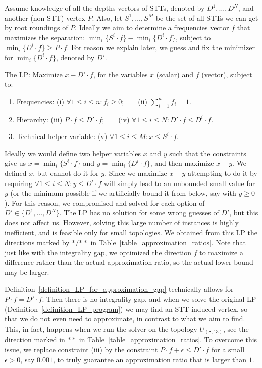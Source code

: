 \begin{definition}
\label{definition_LP_for_approximation_gap}
Assume knowledge of all the depths-vectors of STTs, denoted by $D^1,\ldots,D^N$, and another (non-STT) vertex $P$. Also, let $S^1,\ldots,S^M$ be the set of all STTs we can get by root roundings of $P$. Ideally we aim to determine a frequencies vector $f$ that maximizes the separation: $\min_{i}\{S^i \cdot f\} - \min_{i}\{D^i \cdot f\}$, subject to $\min_{i}\{D^i \cdot f\} \ge P \cdot f$. For reason we explain later, we guess and fix the minimizer for $\min_{i}\{D^i \cdot f\}$, denoted by $D'$.

The LP: Maximize $x - D' \cdot f$, for the variables $x$ (scalar) and $f$ (vector), subject to:
\begin{enumerate}
    \item Frequencies: (i) $\forall 1 \le i \le n: f_i \ge 0$;\ \ \ \ (ii)  $\sum_{i=1}^{n}{f_i} = 1$.
    \item Hierarchy: (iii) $P \cdot f \le D' \cdot f$;\ \ \ \ (iv) $\forall 1 \le i \le N: D' \cdot f \le D^i \cdot f$.
    \item Technical helper variable: (v) $\forall 1 \le i \le M: x \le S^i \cdot f$.
\end{enumerate}
\end{definition}

Ideally we would define two helper variables $x$ and $y$ such that the constraints give us $x = \min_{i}\{S^i \cdot f\}$ and $y = \min_{i}\{D^i \cdot f\}$, and then maximize $x-y$. We defined $x$, but cannot do it for $y$. Since we maximize $x-y$ attempting to do it by requiring $\forall 1 \le i \le N: y \le D^i \cdot f$ will simply lead to an unbounded small value for $y$ (or the minimum possible if we artificially bound it from below, say with $y \ge 0$). For this reason, we compromised and solved for each option of $D' \in \{D^1,\ldots,D^N\}$. The LP has no solution for some wrong guesses of $D'$, but this does not affect us. However, solving this large number of instances is highly inefficient, and is feasible only for small topologies. We obtained from this LP the directions marked by ${*}/{**}$ in Table~\ref{table_approximation_ratios}. Note that just like with the integrality gap, we optimized the direction $f$ to maximize a difference rather than the actual approximation ratio, so the actual lower bound may be larger.

\begin{remark}
\label{remark_int_gap_zero_must_perturb}
Definition~\ref{definition_LP_for_approximation_gap} technically allows for $P \cdot f = D' \cdot f$. Then there is no integrality gap, and when we solve the original LP (Definition~\ref{definition_LP_program}) we may find an STT induced vertex, so that we do not even need to approximate, in contrast to what we aim to find. This, in fact, happens when we run the solver on the topology $U_{(8,13)}$, see the direction marked in ${**}$ in Table~\ref{table_approximation_ratios}. To overcome this issue, we replace constraint (iii) by the constraint $P \cdot f + \epsilon \le D' \cdot f$ for a small $\epsilon > 0$, say $0.001$, to truly guarantee an approximation ratio that is larger than $1$.
\end{remark}

